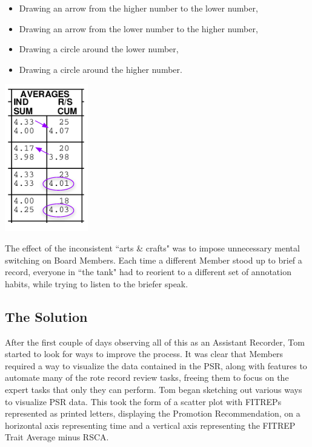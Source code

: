 \documentclass[UTF8]{article}
\begin{document}
\begin{minipage}{0.7\linewidth}
\begin{itemize}
  \item Drawing an arrow from the higher number to the lower number,
  \item Drawing an arrow from the lower number to the higher number,
  \item Drawing a circle around the lower number,
  \item Drawing a circle around the higher number.
\end{itemize}
\end{minipage}
\hfill
\begin{minipage}{0.3\linewidth}
  \includegraphics[width=0.4\linewidth]{inconsisent_annotations.png}\\
\end{minipage}


\pagebreak
The effect of the inconsistent ``arts \& crafts" was to impose unnecessary mental 
switching on Board Members. Each time a different Member stood up to brief a record,
everyone in ``the tank" had to reorient to a different set of annotation habits,
while trying to listen to the briefer speak. 


\subsection{The Solution}

After the first couple of days observing all of this as an Assistant Recorder, 
Tom started to look for ways to improve the process. It was clear that Members 
required a way to visualize the data contained in the PSR, along with features 
to automate many of the rote record review tasks, freeing them to focus on the 
expert tasks that only they can perform. Tom began sketching out various ways to
visualize PSR data. This took the form of a scatter plot with FITREPs 
represented as printed letters, displaying the Promotion Recommendation, on a 
horizontal axis representing time and a vertical axis representing the FITREP
Trait Average minus RSCA. \\
\end{document}
